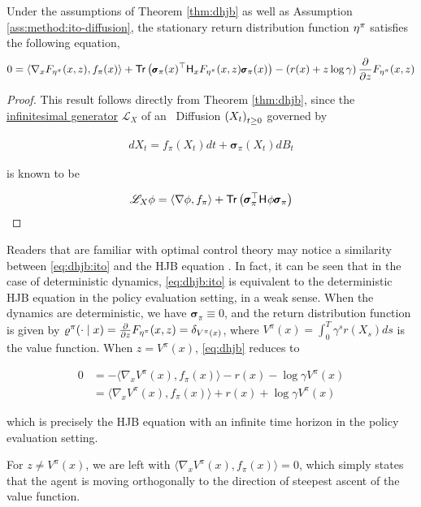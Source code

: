 \begin{corollary}\label{cor:dhjb}
  Under the assumptions of Theorem \ref{thm:dhjb} as well as
  Assumption \ref{ass:method:ito-diffusion}, the stationary return
  distribution function $\returnmeasure^\pi$ satisfies the
  following equation,
  \begin{equation}
    \label{eq:dhjb:ito}
    \small
    0 = \langle\nabla_x\cdf(x, z), f_\pi(x)\rangle +
    \trace\left(\quadraticform{\pmb{\sigma}_\pi(x)}{\hessian{x}\cdf(x, z)}\right)
      - \left(r(x) + z\log\gamma\right)\partialderiv{}{z}\cdf(x, z)
  \end{equation}%
\end{corollary}
\begin{proof}
  This result follows directly from Theorem \ref{thm:dhjb}, since the
  \hyperref[def:generator]{infinitesimal generator} $\mathscr{L}_X$ of an \Ito\
  Diffusion $\indexedabove{t}{X}$ governed by

  \begin{align*}
    dX_t = f_\pi(X_t)dt + \pmb{\sigma}_\pi(X_t)dB_t
  \end{align*}

  is known \citep{rogers1994diffusions, villani2008optimal, Jordan02thevariational} to be

  \begin{align*}
    \mathscr{L}_X\phi = \langle\nabla\phi, f_\pi\rangle +
    \trace\left(\quadraticform{\pmb{\sigma}_\pi}{\hessian{}\phi}\right)
  \end{align*}%
\end{proof}
\begin{remark}
  Readers that are familiar with optimal control theory may notice a
  similarity between \eqref{eq:dhjb:ito} and the HJB equation
  \citep{fleming2006controlled}. In fact, it can be seen that in the
  case of deterministic dynamics, \eqref{eq:dhjb:ito} is equivalent to
  the deterministic HJB equation in the policy
  evaluation setting, in a weak sense. When the dynamics are 
  deterministic, we have $\pmb{\sigma}_\pi\equiv 0$, and the return
  distribution function is given by $\returndistribution^\pi(\cdot\mid
  x)= \partialderiv{}{z}\cdf(x, z) =
  \dirac{V^\pi(x)}$,
  where $V^\pi(x) = \int_0^T\gamma^sr(X_s)ds$
  is the value function. When $z=V^\pi(x)$, \eqref{eq:dhjb} reduces to

  \begin{align*}
    0 &= -\langle\nabla_xV^\pi(x),f_\pi(x)\rangle -r(x) - \log\gamma
        V^\pi(x)\\
    &= \langle\nabla_xV^\pi(x), f_\pi(x)\rangle + r(x) + \log\gamma V^\pi(x)
  \end{align*}

  which is precisely the HJB equation with an infinite
  time horizon \citep[Theorem 1]{Munos2004ASO} in the policy
  evaluation setting.

  For $z\neq V^\pi(x)$, we are left with
  $\langle\nabla_xV^\pi(x),f_\pi(x)\rangle = 0$, which simply states
  that the agent is moving orthogonally to the direction of
  steepest ascent of the value function.
\end{remark}
